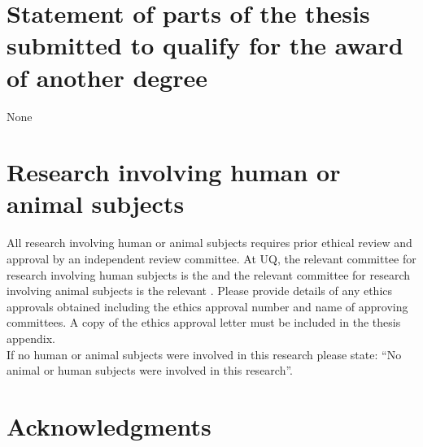 



\pagebreak
\section*{Statement of parts of the thesis submitted to qualify for the award of another degree}
None





\section*{Research involving human or animal subjects}

\begin{instructional}
	All research involving human or animal subjects requires prior ethical review and approval by an independent review committee. At UQ, the relevant committee for research involving human subjects is the \href{http://www.uq.edu.au/research/integrity-compliance/human-ethics}{\color{blue}{Human Ethics Unit}} and the relevant committee for research involving animal subjects is the relevant \href{http://www.uq.edu.au/research/integrity-compliance/animal-welfare}{\color{blue}{Animal Ethics Committee}}.  Please provide details of any ethics approvals obtained including the ethics approval number and name of approving committees.  A copy of the ethics approval letter must be included in the thesis appendix.\\
    
    \noindent
	If no human or animal subjects were involved in this research please state: ``No animal or human subjects were involved in this research''.
\end{instructional}





\clearpage
\section*{Acknowledgments}

